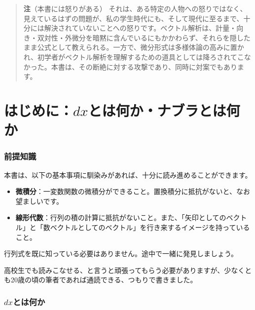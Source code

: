 \documentclass[a4paper,12pt,openany]{book}
\begin{document}
\begin{quote}
\textbf{注}（本書には怒りがある）
それは、ある特定の人物への怒りではなく、見えているはずの問題が、私の学生時代にも、そして現代に至るまで、十分には解決されていないことへの怒りです。ベクトル解析は、計量・向き・双対性・外微分を暗黙に含んでいるにもかかわらず、それらを隠したまま公式として教えられる。一方で、微分形式は多様体論の高みに置かれ、初学者がベクトル解析を理解するための道具としては降ろされてこなかった。本書は、その断絶に対する攻撃であり、同時に対案でもあります。
\end{quote}

\newpage

\hypertarget{ux306fux3058ux3081ux306bdxux3068ux306fux4f55ux304bux30caux30d6ux30e9ux3068ux306fux4f55ux304b}{%
\chapter{\texorpdfstring{はじめに：\(dx\)とは何か・ナブラとは何か}{はじめに：dxとは何か・ナブラとは何か}}\label{ux306fux3058ux3081ux306bdxux3068ux306fux4f55ux304bux30caux30d6ux30e9ux3068ux306fux4f55ux304b}}

\hypertarget{ux524dux63d0ux77e5ux8b58}{%
\subsection{前提知識}\label{ux524dux63d0ux77e5ux8b58}}

本書は、以下の基本事項に馴染みがあれば、十分に読み進めることができます。

\begin{itemize}
\item
  \textbf{微積分}：一変数関数の微積分ができること。置換積分に抵抗がないと、なお望ましいです。
\item
  \textbf{線形代数}：行列の積の計算に抵抗がないこと。また、「矢印としてのベクトル」と「数ベクトルとしてのベクトル」を行き来するイメージを持っていること。
\end{itemize}

行列式を既に知っている必要はありません。途中で一緒に発見しましょう。

高校生でも読みこなせる、と言うと頑張ってもらう必要がありますが、少なくとも20歳の頃の筆者であれば通読できる、つもりで書きました。

\hypertarget{dxux3068ux306fux4f55ux304b}{%
\subsection{\texorpdfstring{\(dx\)とは何か}{dxとは何か}}\label{dxux3068ux306fux4f55ux304b}}
\end{document}
